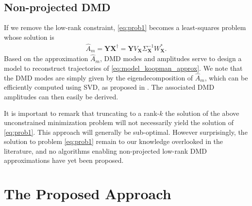 \documentclass{article}
\newcommand{\AAA}{\mathbf{X}}
\newcommand{\BBB}{\mathbf{Y}}
\newcommand{\ie}{\textit{i.e.}, }
\def\remCH#1{{\noindent\color{red}{{\footnotesize [CH: #1]}}}}
\begin{document}
\subsection{Non-projected DMD}
If we remove the low-rank constraint, %
  \eqref{eq:prob1} becomes a least-squares  problem  
whose solution is
\begin{align}\label{eq:exactDMD}
\hat A_m=\BBB\AAA^{\dagger}=\BBB V_\AAA\Sigma_\AAA^{-1}W_\AAA^*.
\end{align}
 Based on the approximation $\hat A_m$, DMD modes and amplitudes serve to  design a   model to reconstruct  trajectories of \eqref{eq:model_koopman_approx}.
 We note that the DMD modes  are simply given by the eigendecomposition of $\hat A_m$, which can be  {efficiently} %
 {computed} using SVD, %
  as proposed in \cite{Tu2014391}. The {associated} DMD amplitudes can then  easily be derived.  

 It is important to remark that  truncating  to a rank-$k$ the solution of the above  unconstrained minimization problem  will not necessarily yield the solution of \eqref{eq:prob1}. This approach   will generally be  sub-optimal. %
However surprisingly, the solution to problem \eqref{eq:prob1}  remain to our knowledge  overlooked in the literature, and no algorithms enabling  non-projected low-rank DMD approximations have yet been proposed.  


\section{ The Proposed Approach}\label{sec:contrib}

 
\end{document}
